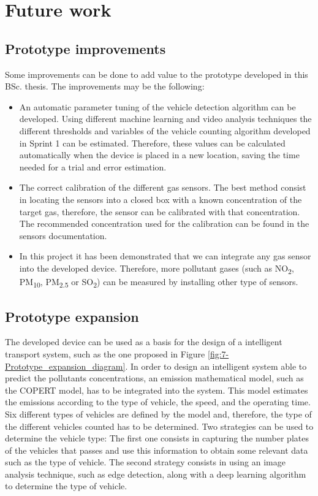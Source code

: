\section{Future work}
\subsection{Prototype improvements}
Some improvements can be done to add value to the prototype developed in this \ac{BSc.} thesis. The improvements may be the following:
\begin{itemize}
	\item An automatic parameter tuning of the vehicle detection algorithm can be developed. Using different machine learning and video analysis techniques the different thresholds and variables of the vehicle counting algorithm developed in Sprint 1 can be estimated. Therefore, these values can be calculated automatically when the device is placed in a new location, saving the time needed for a trial and error estimation. 
	
	\item The correct calibration of the different gas sensors. The best method consist in locating the sensors into a closed box with a known concentration of the target gas, therefore, the sensor can be calibrated with that concentration. The recommended concentration used for the calibration can be found in the sensors documentation. 
	
	\item In this project it has been demonstrated that we can integrate any gas sensor into the developed device. Therefore, more pollutant gases (such as NO\textsubscript{2}, PM\textsubscript{10}, PM\textsubscript{2.5} or  SO\textsubscript{2}) can be measured by installing other type of sensors.
	
\end{itemize}


\subsection{Prototype expansion}
The developed device can be used as a basis for the design of a intelligent transport system, such as the one proposed in Figure \ref{fig:7-Prototype_expansion_diagram}. In order to design an intelligent system able to predict the pollutants concentrations, an emission mathematical model, such as the COPERT \cite{NS16} model, has to be integrated into the system. This model estimates the emissions according to the type of vehicle, the speed, and the operating time. Six different types of vehicles are defined by the model and, therefore, the type of the different vehicles counted has to be determined. Two strategies can be used to determine the vehicle type: The first one consists in capturing the number plates of the vehicles that passes and use this information to obtain some relevant data such as the type of vehicle. The second strategy consists in using an image analysis technique, such as edge detection, along with a deep learning algorithm to determine the type of vehicle.

